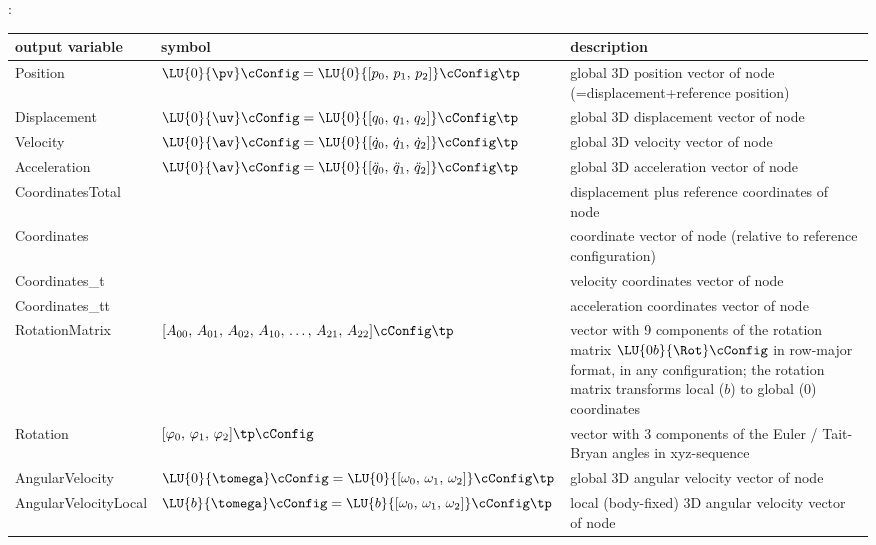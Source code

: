 :
\begin{center}
\footnotesize
\begin{longtable}{| p{5cm} | p{5cm} | p{6cm} |} 
\hline
\bf output variable & \bf symbol & \bf description \\ \hline
Position & $\LU{0}{\pv}\cConfig = \LU{0}{[p_0,\, p_1,\, p_2]}\cConfig\tp$ & global 3D position vector of node (=displacement+reference position)\\ \hline
Displacement & $\LU{0}{\uv}\cConfig = \LU{0}{[q_0,\, q_1,\, q_2]}\cConfig\tp$ & global 3D displacement vector of node\\ \hline
Velocity & $\LU{0}{\av}\cConfig = \LU{0}{[\dot q_0,\,\dot q_1,\,\dot q_2]}\cConfig\tp$ & global 3D velocity vector of node\\ \hline
Acceleration & $\LU{0}{\av}\cConfig = \LU{0}{[\ddot q_0,\,\ddot q_1,\,\ddot q_2]}\cConfig\tp$ & global 3D acceleration vector of node\\ \hline
CoordinatesTotal &  & displacement plus reference coordinates of node\\ \hline
Coordinates &  & coordinate vector of node (relative to reference configuration)\\ \hline
Coordinates\_t &  & velocity coordinates vector of node\\ \hline
Coordinates\_tt &  & acceleration coordinates vector of node\\ \hline
RotationMatrix & $[A_{00},\,A_{01},\,A_{02},\,A_{10},\,\ldots,\,A_{21},\,A_{22}]\cConfig\tp$ & vector with 9 components of the rotation matrix $\LU{0b}{\Rot}\cConfig$ in row-major format, in any configuration; the rotation matrix transforms local ($b$) to global (0) coordinates\\ \hline
Rotation & $[\varphi_0,\,\varphi_1,\,\varphi_2]\tp\cConfig$ & vector with 3 components of the Euler / Tait-Bryan angles in xyz-sequence\\ \hline
AngularVelocity & $\LU{0}{\tomega}\cConfig = \LU{0}{[\omega_0,\,\omega_1,\,\omega_2]}\cConfig\tp$ & global 3D angular velocity vector of node\\ \hline
AngularVelocityLocal & $\LU{b}{\tomega}\cConfig = \LU{b}{[\omega_0,\,\omega_1,\,\omega_2]}\cConfig\tp$ & local (body-fixed)  3D angular velocity vector of node\\ \hline
\end{longtable}
\end{center}
\newpage

